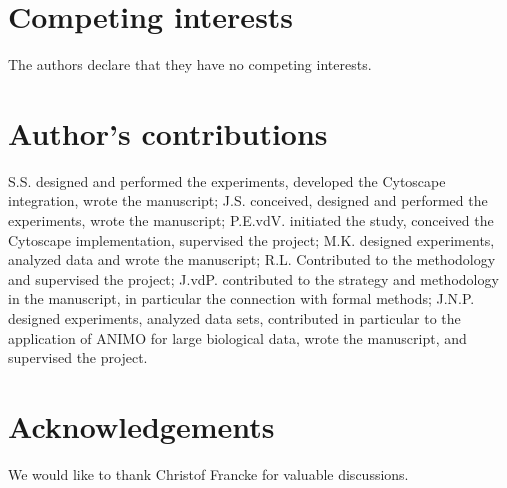 \documentclass{bmcart}
\begin{document}
\begin{backmatter}

\section*{Competing interests}
The authors declare that they have no competing interests.

\section*{Author's contributions}
S.S. designed and performed the experiments, developed the Cytoscape integration, wrote the manuscript;
J.S. conceived, designed and performed the experiments, wrote the manuscript;
P.E.vdV. initiated the study, conceived the Cytoscape implementation, supervised the project;
M.K. designed experiments, analyzed data and wrote the manuscript;
R.L. Contributed to the methodology and supervised the project;
J.vdP. contributed to the strategy and methodology in the manuscript, in particular the connection with formal methods;
J.N.P. designed experiments, analyzed data sets, contributed in particular to the application of ANIMO for large biological data, wrote the manuscript, and supervised the project.

\section*{Acknowledgements}
We would like to thank Christof Francke for valuable discussions.


\end{backmatter}
\end{document}

